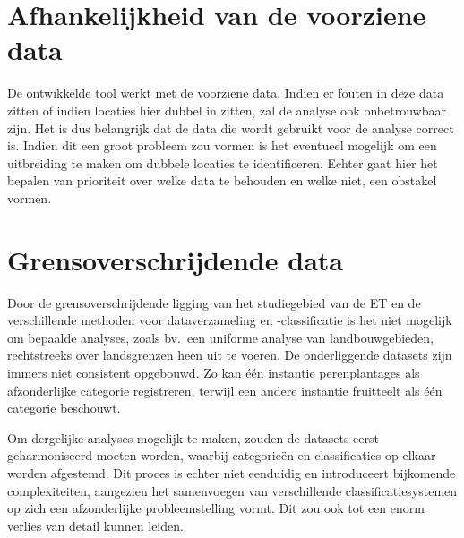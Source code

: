 \section{Afhankelijkheid van de voorziene data}
De ontwikkelde tool werkt met de voorziene data. Indien er fouten in deze data zitten of indien locaties hier dubbel in zitten, zal de analyse ook onbetrouwbaar zijn. Het is dus belangrijk dat de data die wordt gebruikt voor de analyse correct is. Indien dit een groot probleem zou vormen is het eventueel mogelijk om een uitbreiding te maken om dubbele locaties te identificeren. Echter gaat hier het bepalen van prioriteit over welke data te behouden en welke niet, een obstakel vormen.

\section{Grensoverschrijdende data}
Door de grensoverschrijdende ligging van het studiegebied van de ET en de verschillende methoden voor dataverzameling en -classificatie is het niet mogelijk om bepaalde analyses, zoals bv.\ een uniforme analyse van landbouwgebieden, rechtstreeks over landsgrenzen heen uit te voeren. De onderliggende datasets zijn immers niet consistent opgebouwd. Zo kan één instantie perenplantages als afzonderlijke categorie registreren, terwijl een andere instantie fruitteelt als één categorie beschouwt. 

Om dergelijke analyses mogelijk te maken, zouden de datasets eerst geharmoniseerd moeten worden, waarbij categorieën en classificaties op elkaar worden afgestemd. Dit proces is echter niet eenduidig en introduceert bijkomende complexiteiten, aangezien het samenvoegen van verschillende classificatiesystemen op zich een afzonderlijke probleemstelling vormt. Dit zou ook tot een enorm verlies van detail kunnen leiden.